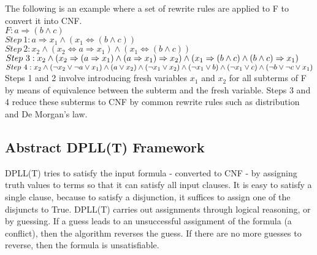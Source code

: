 \documentclass{report}
\begin{document}
The following is an example where a set of rewrite rules
are applied to F to convert it into CNF. \\
$F: a \Rightarrow (b \land c)$ \\
$Step\ 1: a \Rightarrow x_1 \land (x_1 \iff (b \land c))$ \\
$Step\ 2: x_2 \land (x_2 \iff a \Rightarrow x_1) \land 
(x_1 \iff (b \land c))$ \\
$Step\ 3: x_2 \land \\
(x_2 \Rightarrow (a \Rightarrow x_1) \land 
(a \Rightarrow x_1) \Rightarrow x_2) \land \\
(x_1 \Rightarrow (b \land c) \land 
(b \land c) \Rightarrow x_1)$ \\
$Step\ 4: x_2 \land \\
(\neg x_2 \lor \neg a \lor x_1) \land 
(a \lor x_2) \land (\neg x_1 \lor x_2) \land \\
(\neg x_1 \lor b) \land (\neg x_1 \lor c) \land 
(\neg b \lor \neg c \lor x_1)$ \\
Steps 1 and 2 involve introducing fresh variables $x_1$
and $x_2$ for all subterms of F by means of equivalence 
between the subterm and the fresh variable. Steps 3 and 4 
reduce these subterms to CNF by common rewrite rules 
such as distribution and De Morgan's law.


\subsection{Abstract DPLL(T) Framework}
\label{sec:trans}
DPLL(T) tries to satisfy the input formula - converted to 
CNF - by assigning truth values to terms so that it can
satisfy all input clauses. It is easy to satisfy a single
clause, because to satisfy a disjunction, it suffices to
assign one of the disjuncts to True. DPLL(T) carries out
assignments through logical reasoning, or by guessing. If a
guess leads to an unsuccessful assignment of the formula 
(a conflict), then the algorithm reverses the guess. 
If there are no more guesses to reverse, then the formula is
unsatisfiable.
\end{document}
